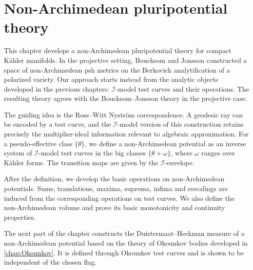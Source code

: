 \chapter{Non-Archimedean pluripotential theory}
\label{chap:NApotential}

This chapter develops a non-Archimedean pluripotential theory for compact K\"ahler manifolds. In the projective setting, Boucksom and Jonsson constructed a space of non-Archimedean psh metrics on the Berkovich analytification of a polarized variety. Our approach starts instead from the analytic objects developed in the previous chapters: $\mathcal I$-model test curves and their operations. The resulting theory agrees with the Boucksom--Jonsson theory in the projective case.

The guiding idea is the Ross--Witt Nystr\"om correspondence. A geodesic ray can be encoded by a test curve, and the $\mathcal I$-model version of this construction retains precisely the multiplier-ideal information relevant to algebraic approximation. For a pseudo-effective class $\{\theta\}$, we define a non-Archimedean potential as an inverse system of $\mathcal I$-model test curves in the big classes $\{\theta+\omega\}$, where $\omega$ ranges over K\"ahler forms. The transition maps are given by the $\mathcal I$-envelope.

After the definition, we develop the basic operations on non-Archimedean potentials. Sums, translations, maxima, suprema, infima and rescalings are induced from the corresponding operations on test curves. We also define the non-Archimedean volume and prove its basic monotonicity and continuity properties.

The next part of the chapter constructs the Duistermaat--Heckman measure of a non-Archimedean potential based on the theory of Okounkov bodies developed in \cref{chap:Okounkov}. It is defined through Okounkov test curves and is shown to be independent of the chosen flag.

